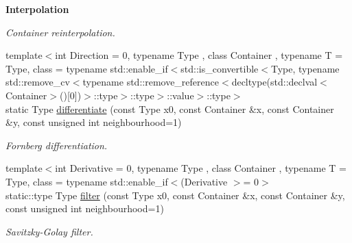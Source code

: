 \begin{Indent}{\bf Interpolation}
\begin{DoxyCompactItemize}
\begin{DoxyCompactList}\small\item\em Container reinterpolation. \end{DoxyCompactList}\item 
{\footnotesize template$<$int Direction = 0, typename Type , class Container , typename T  = Type, class  = typename std\-::enable\-\_\-if$<$std\-::is\-\_\-convertible$<$\-Type, typename std\-::remove\-\_\-cv$<$typename std\-::remove\-\_\-reference$<$decltype(std\-::declval$<$\-Container$>$()\mbox{[}0\mbox{]})$>$\-::type$>$\-::type$>$\-::value$>$\-::type$>$ }\\static Type \hyperlink{exceptionUtility_a1eed714b7c2401dea0610e2d7e98b6de}{differentiate} (const Type x0, const Container \&x, const Container \&y, const unsigned int neighbourhood=1)
\begin{DoxyCompactList}\small\item\em Fornberg differentiation. \end{DoxyCompactList}\item 
{\footnotesize template$<$int Derivative = 0, typename Type , class Container , typename T  = Type, class  = typename std\-::enable\-\_\-if$<$(\-Derivative $>$= 0$>$ }\\static\-::type Type \hyperlink{exceptionUtility_a1097fff224514bdabe48e44a414e997b}{filter} (const Type x0, const Container \&x, const Container \&y, const unsigned int neighbourhood=1)
\begin{DoxyCompactList}\small\item\em Savitzky-\/\-Golay filter. \end{DoxyCompactList}\end{DoxyCompactItemize}
\end{Indent}
